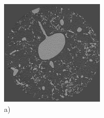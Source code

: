 \documentclass{thesis}%
\begin{document}
 \begin{figure}[htp!]
  \centering
  
   \begin{minipage}[c]{0.4\textwidth}
	\centering\includegraphics[width=5cm]{bluring/origImg.jpg}\\
     a)
   \end{minipage}
   \hspace*{0.5cm}
    \begin{minipage}[c]{0.4\textwidth}
    

\end{minipage}
\end{figure}
\end{document}

